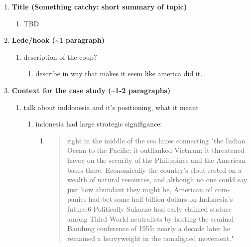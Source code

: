 \documentclass[letterpaper]{article}
\begin{document}
\begin{enumerate}
\item \textbf{Title (Something catchy: short summary of topic)}

\begin{enumerate}
\item TBD
\end{enumerate}

\item \textbf{Lede/hook (\textasciitilde{}1 paragraph)}

\begin{enumerate}
\item description of the coup?

\begin{enumerate}
\item describe in way that makes it seem like america did it.
\end{enumerate}
\end{enumerate}

\item \textbf{Context for the case study (\textasciitilde{}1-2 paragraphs)}

\begin{enumerate}
\item talk about inddonesia and it's positioning, what it meant

\begin{enumerate}
\item indonesia had large strategic signifigance:

\begin{enumerate}
\item \begin{quote}
right in the middle of the sea lanes connecting "the
Indian Ocean to the Pacific; it outflanked Vietnam; it
threatened havoc on the security of the Philippines and
the American bases there. Economically the country's clout
rested on a wealth of natural resources, and although no
one could say just how abundant they might be, American
oil com- panies had bet some half-billion dollars on
Indonesia's future.6 Politically Sukarno had early claimed
stature among Third World neutralists by hosting the
seminal Bandung conference of 1955; nearly a decade later
he remained a heavyweight in the nonaligned movement."
\end{quote}
\end{enumerate}
\end{enumerate}
\end{enumerate}


\end{enumerate}
\end{document}

